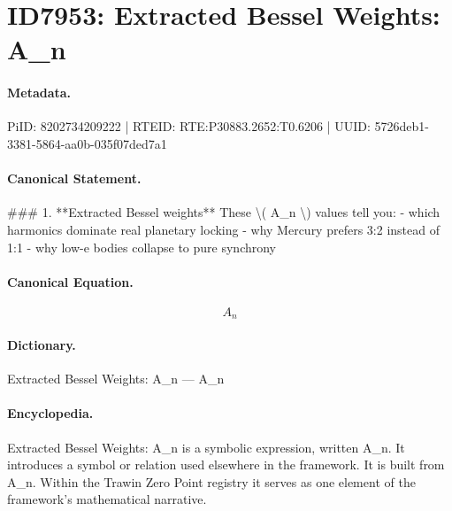 \section*{ID7953: Extracted Bessel Weights: A\_n}
\paragraph{Metadata.}
PiID: 8202734209222 | RTEID: RTE:P30883.2652:T0.6206 | UUID: 5726deb1-3381-5864-aa0b-035f07ded7a1

\paragraph{Canonical Statement.}
\#\#\# 1. **Extracted Bessel weights** These \textbackslash{}( A\_n \textbackslash{}) values tell you: - which harmonics dominate real planetary locking - why Mercury prefers 3:2 instead of 1:1 - why low-e bodies collapse to pure synchrony

\paragraph{Canonical Equation.}
\[
A_n
\]

\paragraph{Dictionary.}
Extracted Bessel Weights: A\_n — A\_n

\paragraph{Encyclopedia.}
Extracted Bessel Weights: A\_n is a symbolic expression, written A\_n. It introduces a symbol or relation used elsewhere in the framework. It is built from A\_n. Within the Trawin Zero Point registry it serves as one element of the framework's mathematical narrative.
